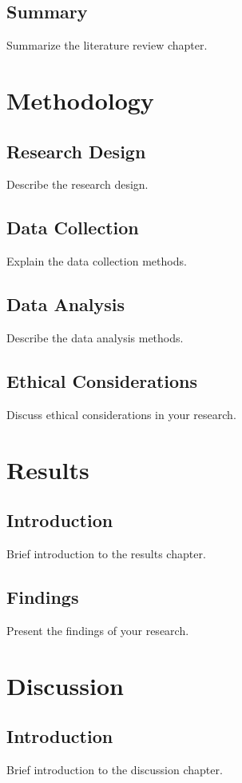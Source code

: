 \documentclass[12pt, oneside]{book}
\begin{document}
\section{Summary}
Summarize the literature review chapter.

\clearpage
\chapter{Methodology}
\section{Research Design}
Describe the research design.

\section{Data Collection}
Explain the data collection methods.

\section{Data Analysis}
Describe the data analysis methods.

\section{Ethical Considerations}
Discuss ethical considerations in your research.

\clearpage
\chapter{Results}
\section{Introduction}
Brief introduction to the results chapter.

\section{Findings}
Present the findings of your research.

\clearpage
\chapter{Discussion}
\section{Introduction}
Brief introduction to the discussion chapter.
\end{document}
